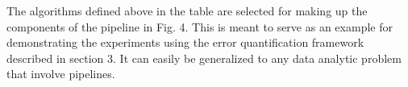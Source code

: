 The algorithms defined above in the table are selected for making up the components of the pipeline in Fig. 4. This is meant to serve as an example for demonstrating the experiments using the error quantification framework described in section 3. It can easily be generalized to any data analytic problem that involve pipelines. 

